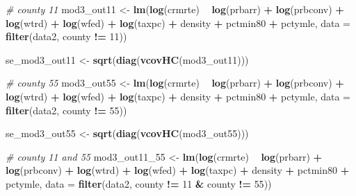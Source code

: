 \documentclass[]{article}
\newenvironment{Shaded}{\begin{snugshade}}{\end{snugshade}}
\newcommand{\CommentTok}[1]{\textcolor[rgb]{0.56,0.35,0.01}{\textit{#1}}}
\newcommand{\DataTypeTok}[1]{\textcolor[rgb]{0.13,0.29,0.53}{#1}}
\newcommand{\DecValTok}[1]{\textcolor[rgb]{0.00,0.00,0.81}{#1}}
\newcommand{\KeywordTok}[1]{\textcolor[rgb]{0.13,0.29,0.53}{\textbf{#1}}}
\newcommand{\NormalTok}[1]{#1}
\newcommand{\OperatorTok}[1]{\textcolor[rgb]{0.81,0.36,0.00}{\textbf{#1}}}
\newcommand{\StringTok}[1]{\textcolor[rgb]{0.31,0.60,0.02}{#1}}
\begin{document}
\begin{Shaded}
\begin{Highlighting}[]
\CommentTok{# county 11}
\NormalTok{mod3_out11 <-}\StringTok{ }\KeywordTok{lm}\NormalTok{(}\KeywordTok{log}\NormalTok{(crmrte) }\OperatorTok{~}\StringTok{ }\KeywordTok{log}\NormalTok{(prbarr) }\OperatorTok{+}\StringTok{ }\KeywordTok{log}\NormalTok{(prbconv) }\OperatorTok{+}\StringTok{ }\KeywordTok{log}\NormalTok{(wtrd)  }\OperatorTok{+}\StringTok{ }\KeywordTok{log}\NormalTok{(wfed) }\OperatorTok{+}\StringTok{ }\KeywordTok{log}\NormalTok{(taxpc) }\OperatorTok{+}\StringTok{ }\NormalTok{density }\OperatorTok{+}\StringTok{ }\NormalTok{pctmin80 }\OperatorTok{+}\StringTok{ }\NormalTok{pctymle, }\DataTypeTok{data =} \KeywordTok{filter}\NormalTok{(data2, county }\OperatorTok{!=}\StringTok{ }\DecValTok{11}\NormalTok{)) }

\NormalTok{se_mod3_out11 <-}\StringTok{ }\KeywordTok{sqrt}\NormalTok{(}\KeywordTok{diag}\NormalTok{(}\KeywordTok{vcovHC}\NormalTok{(mod3_out11)))}

\CommentTok{# county 55}
\NormalTok{mod3_out55 <-}\StringTok{ }\KeywordTok{lm}\NormalTok{(}\KeywordTok{log}\NormalTok{(crmrte) }\OperatorTok{~}\StringTok{ }\KeywordTok{log}\NormalTok{(prbarr) }\OperatorTok{+}\StringTok{ }\KeywordTok{log}\NormalTok{(prbconv) }\OperatorTok{+}\StringTok{ }\KeywordTok{log}\NormalTok{(wtrd)  }\OperatorTok{+}\StringTok{ }\KeywordTok{log}\NormalTok{(wfed) }\OperatorTok{+}\StringTok{ }\KeywordTok{log}\NormalTok{(taxpc) }\OperatorTok{+}\StringTok{ }\NormalTok{density }\OperatorTok{+}\StringTok{ }\NormalTok{pctmin80 }\OperatorTok{+}\StringTok{ }\NormalTok{pctymle, }\DataTypeTok{data =} \KeywordTok{filter}\NormalTok{(data2, county }\OperatorTok{!=}\StringTok{ }\DecValTok{55}\NormalTok{)) }

\NormalTok{se_mod3_out55 <-}\StringTok{ }\KeywordTok{sqrt}\NormalTok{(}\KeywordTok{diag}\NormalTok{(}\KeywordTok{vcovHC}\NormalTok{(mod3_out55)))}

\CommentTok{# county 11 and 55}
\NormalTok{mod3_out11_}\DecValTok{55}\NormalTok{ <-}\StringTok{ }\KeywordTok{lm}\NormalTok{(}\KeywordTok{log}\NormalTok{(crmrte) }\OperatorTok{~}\StringTok{ }\KeywordTok{log}\NormalTok{(prbarr) }\OperatorTok{+}\StringTok{ }\KeywordTok{log}\NormalTok{(prbconv) }\OperatorTok{+}\StringTok{ }\KeywordTok{log}\NormalTok{(wtrd)  }\OperatorTok{+}\StringTok{ }\KeywordTok{log}\NormalTok{(wfed) }\OperatorTok{+}\StringTok{ }\KeywordTok{log}\NormalTok{(taxpc) }\OperatorTok{+}\StringTok{ }\NormalTok{density }\OperatorTok{+}\StringTok{ }\NormalTok{pctmin80 }\OperatorTok{+}\StringTok{ }\NormalTok{pctymle, }\DataTypeTok{data =} \KeywordTok{filter}\NormalTok{(data2, county }\OperatorTok{!=}\StringTok{ }\DecValTok{11} \OperatorTok{&}\StringTok{ }\NormalTok{county }\OperatorTok{!=}\StringTok{ }\DecValTok{55}\NormalTok{)) }


\end{Highlighting}
\end{Shaded}
\end{document}
